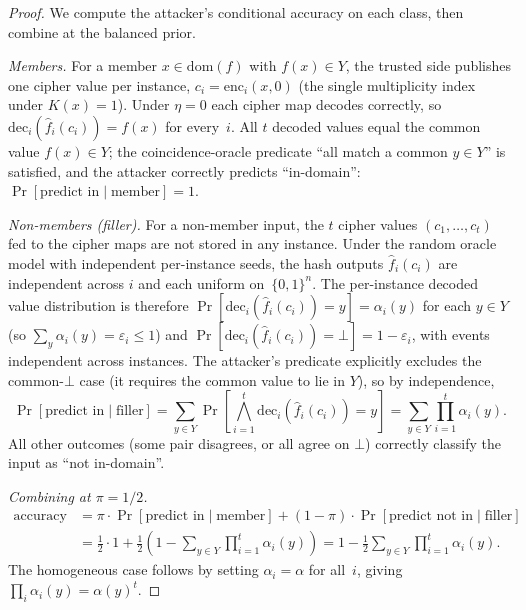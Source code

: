 \documentclass[11pt]{article}
\theoremstyle{definition}
\theoremstyle{plain}
\theoremstyle{remark}
\newcommand{\fhat}{\hat{f}}
\newcommand{\enc}{\mathrm{enc}}
\newcommand{\dec}{\mathrm{dec}}
\newcommand{\B}{\{0,1\}}
\begin{document}
\begin{proof}
We compute the attacker's conditional accuracy on each class, then
combine at the balanced prior.

\emph{Members.}
For a member $x \in \mathrm{dom}(f)$ with $f(x) \in Y$, the trusted side
publishes one cipher value per instance, $c_i = \enc_i(x, 0)$ (the
single multiplicity index under $K(x) = 1$).  Under $\eta = 0$ each
cipher map decodes correctly, so
$\dec_i(\fhat_i(c_i)) = f(x)$ for every~$i$.  All $t$ decoded values
equal the common value $f(x) \in Y$; the coincidence-oracle predicate
``all match a common $y \in Y$'' is satisfied, and the attacker
correctly predicts ``in-domain'':
$\Pr[\text{predict in} \mid \text{member}] = 1$.

\emph{Non-members (filler).}
For a non-member input, the $t$ cipher values $(c_1, \ldots, c_t)$
fed to the cipher maps are not stored in any instance.  Under the
random oracle model with independent per-instance seeds, the hash
outputs $\fhat_i(c_i)$ are independent across $i$ and each uniform
on~$\B^n$.  The per-instance decoded value distribution is therefore
$\Pr[\dec_i(\fhat_i(c_i)) = y] = \alpha_i(y)$ for each $y \in Y$
(so $\sum_{y} \alpha_i(y) = \varepsilon_i \le 1$) and
$\Pr[\dec_i(\fhat_i(c_i)) = \bot] = 1 - \varepsilon_i$, with
events independent across instances.  The attacker's predicate
explicitly excludes the common-$\bot$ case (it requires the common
value to lie in $Y$), so by independence,
\[
\Pr[\text{predict in} \mid \text{filler}]
  = \sum_{y \in Y} \Pr\!\left[\bigwedge_{i=1}^{t} \dec_i(\fhat_i(c_i)) = y\right]
  = \sum_{y \in Y} \prod_{i=1}^{t} \alpha_i(y).
\]
All other outcomes (some pair disagrees, or all agree on $\bot$)
correctly classify the input as ``not in-domain''.

\emph{Combining at $\pi = 1/2$.}
\begin{align*}
\mathrm{accuracy}
  &= \pi \cdot \Pr[\text{predict in} \mid \text{member}]
   + (1 - \pi) \cdot \Pr[\text{predict not in} \mid \text{filler}] \\
  &= \tfrac{1}{2} \cdot 1
   + \tfrac{1}{2} \left(1 - \sum_{y \in Y} \prod_{i=1}^{t} \alpha_i(y)\right)
   = 1 - \tfrac{1}{2} \sum_{y \in Y} \prod_{i=1}^{t} \alpha_i(y).
\end{align*}
The homogeneous case follows by setting $\alpha_i = \alpha$ for
all~$i$, giving $\prod_i \alpha_i(y) = \alpha(y)^t$.
\end{proof}
\end{document}
